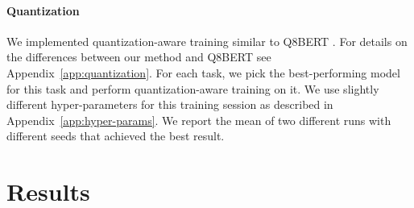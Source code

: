 \documentclass{article}
\begin{document}
\paragraph{Quantization}
\label{sec:quantization}
We implemented quantization-aware training similar to Q8BERT \citep{zafrir2019q8bert}.
For details on the differences between our method and Q8BERT see Appendix~\ref{app:quantization}.
For each task, we pick the best-performing model for this task and perform quantization-aware training on it.
We use slightly different hyper-parameters for this training session as described in Appendix~\ref{app:hyper-params}.
We report the mean of two different runs with different seeds that achieved the best result.

\section{Results}
\label{sec:results}
\end{document}
